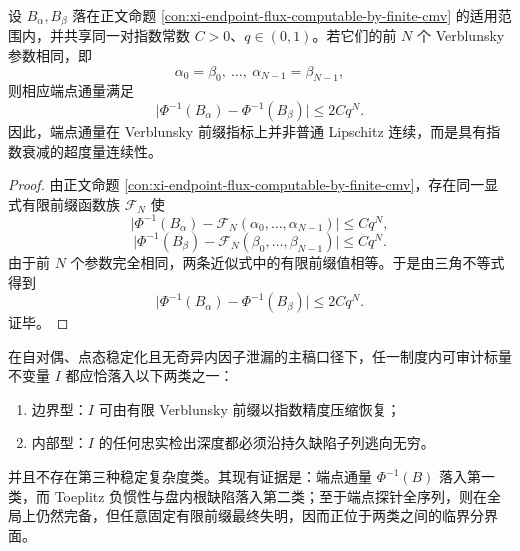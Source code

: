 \begin{proposition}\label{prop:conclusion-visible-endpoint-flux-ultrametric-continuity}
设 \(B_\alpha,B_\beta\) 落在正文命题 \ref{con:xi-endpoint-flux-computable-by-finite-cmv} 的适用范围内，并共享同一对指数常数 \(C>0\)、\(q\in(0,1)\)。若它们的前 \(N\) 个 Verblunsky 参数相同，即
\[
\alpha_0=\beta_0,\ \dots,\ \alpha_{N-1}=\beta_{N-1},
\]
则相应端点通量满足
\[
\bigl|\Phi^{-1}(B_\alpha)-\Phi^{-1}(B_\beta)\bigr|
\le 2Cq^N.
\]
因此，端点通量在 Verblunsky 前缀指标上并非普通 Lipschitz 连续，而是具有指数衰减的超度量连续性。
\end{proposition}
\begin{proof}
由正文命题 \ref{con:xi-endpoint-flux-computable-by-finite-cmv}，存在同一显式有限前缀函数族 \(\mathcal F_N\) 使
\[
\bigl|\Phi^{-1}(B_\alpha)-\mathcal F_N(\alpha_0,\dots,\alpha_{N-1})\bigr|\le Cq^N,
\]
\[
\bigl|\Phi^{-1}(B_\beta)-\mathcal F_N(\beta_0,\dots,\beta_{N-1})\bigr|\le Cq^N.
\]
由于前 \(N\) 个参数完全相同，两条近似式中的有限前缀值相等。于是由三角不等式得到
\[
\bigl|\Phi^{-1}(B_\alpha)-\Phi^{-1}(B_\beta)\bigr|
\le 2Cq^N.
\]
证毕。
\end{proof}

\begin{conjecture}\label{conj:conclusion-selfdual-cmv-audit-two-phase-dichotomy}
在自对偶、点态稳定化且无奇异内因子泄漏的主稿口径下，任一制度内可审计标量不变量 \(I\) 都应恰落入以下两类之一：
\begin{enumerate}
  \item 边界型：\(I\) 可由有限 Verblunsky 前缀以指数精度压缩恢复；
  \item 内部型：\(I\) 的任何忠实检出深度都必须沿持久缺陷子列逃向无穷。
\end{enumerate}
并且不存在第三种稳定复杂度类。其现有证据是：端点通量 \(\Phi^{-1}(B)\) 落入第一类，而 Toeplitz 负惯性与盘内根缺陷落入第二类；至于端点探针全序列，则在全局上仍然完备，但任意固定有限前缀最终失明，因而正位于两类之间的临界分界面。
\end{conjecture}

